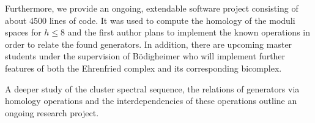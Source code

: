 Furthermore, we provide an ongoing, extendable software project consisting of about 4500 lines of code.
It was used to compute the homology of the moduli spaces for $h \le 8$ and
the first author plans to implement the known operations in order to relate the found generators.
In addition, there are upcoming master students under the supervision of Bödigheimer who will implement further features of both the Ehrenfried complex and its corresponding bicomplex.

A deeper study of the cluster spectral sequence, the relations of generators via homology operations and the interdependencies of these operations outline an ongoing research project.